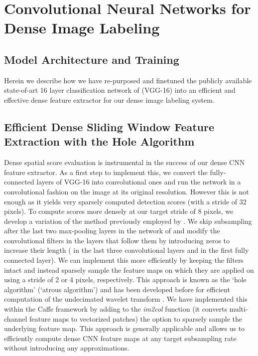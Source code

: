 \section{Convolutional Neural Networks for Dense Image Labeling}
\label{sec:convnets}

\subsection{Model Architecture and Training}
\label{sec:convnet-arch}

Herein we describe how we have re-purposed and finetuned the publicly
available state-of-art 16 layer classification network of
\cite{simonyan2014very} (VGG-16) into an efficient and effective dense feature
extractor for our dense image labeling system.

\subsection{Efficient Dense Sliding Window Feature Extraction with the Hole Algorithm}
\label{sec:convnet-hole}

Dense spatial score evaluation is instrumental in the success of our dense CNN
feature extractor. As a first step to implement this, we convert the
fully-connected layers of VGG-16 into convolutional ones and run the network
in a convolutional fashion on the image at its original resolution. However
this is not enough as it yields very sparsely computed detection scores (with
a stride of 32 pixels). To compute scores more densely at our target stride of
8 pixels, we develop a variation of the method previously employed by
\cite{GCMG+13, sermanet2013overfeat}. We skip subsampling after the last two
max-pooling layers in the network of \cite{simonyan2014very} and modify the
convolutional filters in the layers that follow them by introducing zeros to
increase their length ( in the last three convolutional layers and
 in the first fully connected layer). We can implement this more
efficiently by keeping the filters intact and instead sparsely sample the
feature maps on which they are applied on using a stride of 2 or 4 pixels,
respectively. This approach is known as the `hole algorithm' (`atrous
algorithm') and has been developed before for efficient computation of the
undecimated wavelet transform \cite{Mall99}. We have implemented this within
the Caffe framework \citep{jia2014caffe} by adding to the \textsl{im2col}
function (it converts multi-channel feature maps to vectorized patches) the
option to sparsely sample the underlying feature map. This approach is
generally applicable and allows us to efficiently compute dense CNN feature
maps at any target subsampling rate without introducing any approximations.

